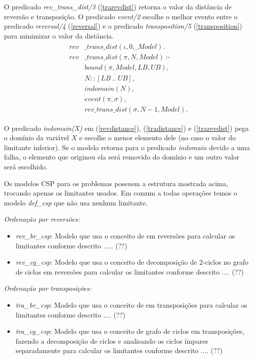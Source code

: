 O predicado \textit{rev\_trans\_dist/3} (\ref{trarevdist}) retorna o
valor da distância de reversão e transposição. O
predicado \textit{event/2} escolhe o melhor evento entre o
predicado \textit{reversal/4} (\ref{reversal}) e o
predicado \textit{transposition/5} (\ref{transposition}) para
minimizar o valor da distância.
\begin{align}
  \label{trarevdist}
  \begin{split}
  \textit{rev}&\textit{\_trans\_dist}(\iota, 0, \_Model). \\
  \textit{rev}&\textit{\_trans\_dist}(\pi, N, Model)~\text{:-} \\
  &\textit{bound}(\pi, Model, LB, UB), \\
  &N :: [LB~..~UB], \\
  &\textit{indomain}(N),  \\
  &\textit{event}(\pi, \sigma),  \\
  &\textit{rev\_trans\_dist}(\sigma, N-1, Model). 
  \end{split}
\end{align}

O predicado \textit{indomain(X)} em (\ref{revdistance}),
(\ref{tradistance}) e (\ref{trarevdist}) pega o domínio da variável
$X$ e escolhe o menor elemento dele (no caso o valor do limitante
inferior). Se o modelo retorna para o predicado \textit{indomain}
devido a uma falha, o elemento que originou ela será removido do
domínio e um outro valor será escolhido.

Os modelos CSP para os problemas possuem a estrutura mostrada acima,
trocando apenas os limitantes usados. Em comum a todas operações temos
o modelo \textit{def\_csp} que não usa nenhum limitante.

\textit{Ordenação por reversões:}
\begin{itemize}
\item{\textit{rev\_br\_csp}: 
Modelo que usa o conceito de \bkp{} em reversões para calcular os
limitantes conforme descrito ..... (??)}
\item{\textit{rev\_cg\_csp}:
Modelo que usa o conceito de decomposição de 2-ciclos no grafo de
ciclos em reversões para calcular os limitantes conforme descrito
.... (??)}
\end{itemize}

\textit{Ordenação por transposições:}
\begin{itemize}
\item{\textit{tra\_br\_csp}: 
Modelo que usa o conceito de \bkp{} em transposições para calcular os
limitantes conforme descrito .... (??)}
\item{\textit{tra\_cg\_csp}:
Modelo que usa o conceito de grafo de ciclos em transposições, fazendo
a decomposição de ciclos e analisando os ciclos ímpares separadamente
para calcular os limitantes conforme descrito .... (??)}
\end{itemize}

